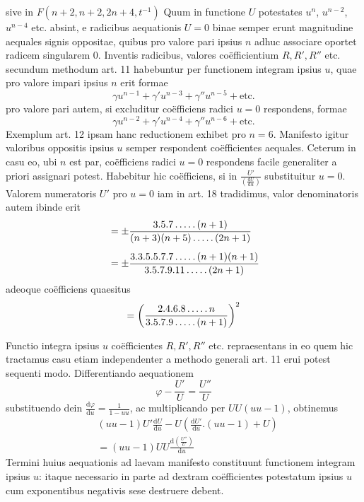 sive in $F(n+2,n+2,2n+4,t^{-1})$
Quum in functione $U$ potestates $u^n$, $u^{n-2}$, $u^{n-4}$
etc. absint, e radicibus aequationis $U=0$ binae semper erunt
magnitudine aequales signis oppositae, quibus pro valore pari
ipsius $n$ adhuc associare oportet radicem singularem $0$.
Inventis radicibus, valores coëfficientium $R,R',R''$ etc.
secundum methodum art. 11 habebuntur per functionem integram
ipsius $u$, quae pro valore impari ipsius $n$ erit formae
\[
\gamma u^{n-1}+\gamma'u^{n-3}+\gamma''u^{n-5}+\mathrm{etc.}
\]
pro valore pari autem, si excluditur coëfficiens radici $u=0$
respondens, formae
\[
\gamma u^{n-2}+\gamma'u^{n-4}+\gamma''u^{n-6}+\mathrm{etc.}
\]
Exemplum art. 12 ipsam hanc reductionem exhibet pro $n=6$.
Manifesto igitur valoribus oppositis ipsius $u$ semper respondent
coëfficientes aequales. Ceterum in casu eo, ubi $n$ est par,
coëfficiens radici $u=0$ respondens facile generaliter a priori
assignari potest. Habebitur hic coëfficiens, si in
$\frac{U'}{(\frac{\mathrm{d}U}{\mathrm{d}u})}$ substituitur
$u=0$. Valorem numeratoris $U'$ pro $u=0$ iam in art. 18
tradidimus, valor denominatoris autem ibinde erit
\[
\begin{aligned}&=\pm\frac{3.5.7\mathinner{.\,.\,.\,.\,.}(n+1)}
{(n+3)(n+5)\mathinner{.\,.\,.\,.\,.}(2n+1)}\\[5pt]&=\pm\frac{3.3.5.5.7.7\mathinner{.\,.\,.\,.\,.}(n+1)(n+1)}
{3.5.7.9.11\mathinner{.\,.\,.\,.\,.}(2n+1)}\end{aligned}
\]
adeoque coëfficiens quaesitus
\[
=\left(\frac{2.4.6.8\mathinner{.\,.\,.\,.\,.} n}
{3.5.7.9\mathinner{.\,.\,.\,.\,.}(n+1)}\right)^2
\]

Functio integra ipsius $u$ coëfficientes $R,R',R''$ etc.
repraesentans in eo quem hic tractamus casu etiam independenter
a methodo generali art. 11 erui potest sequenti modo.
Differentiando aequationem
\[
\varphi-\frac{U'}U=\frac{U''}U
\]
substituendo dein $\frac{\mathrm{d}\varphi}{\mathrm{d}u}
=\frac1{1-uu}$, ac multiplicando per $UU(uu-1)$, obtinemus
\[
\begin{aligned}&(uu-1)U'\frac{\mathrm{d}U}{\mathrm{d}u}
-U\left(\frac{\mathrm{d}U'}{\mathrm{d}u}.(uu-1)+U\right)\\[5pt]&=(uu-1)UU\frac{\mathrm{d}(\frac{U''}U)}{\mathrm{d}u}\end{aligned}
\]
Termini huius aequationis ad laevam manifesto constituunt
functionem integram ipsius $u$: itaque necessario in parte ad
dextram coëfficientes potestatum ipsius $u$ cum exponentibus
negativis sese destruere debent.

